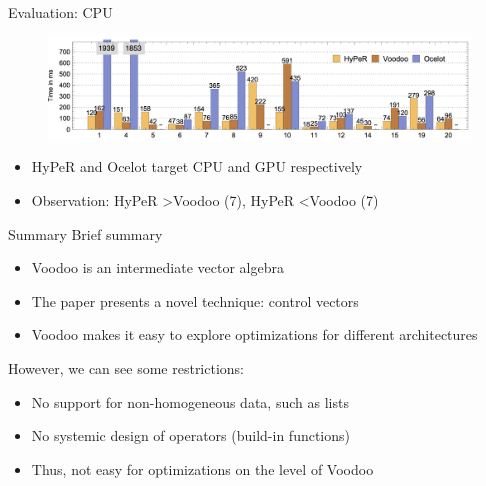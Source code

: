 \begin{frame}{Evaluation: CPU}
\begin{figure}[htb]
\includegraphics[width=1\textwidth]{fig/voodoo-fig13.png}
\end{figure}
\begin{itemize}
\item HyPeR and Ocelot target CPU and GPU respectively
\item Observation: HyPeR \textgreater Voodoo (7), HyPeR \textless Voodoo (7)
\end{itemize} 
\end{frame}

\begin{frame}{Summary}
Brief summary
\begin{itemize}
\item Voodoo is an intermediate vector algebra
\item The paper presents a novel technique: control vectors
\item Voodoo makes it easy to explore optimizations for different architectures
\end{itemize} 
\pause
However, we can see some restrictions:
\begin{itemize}
\item No support for non-homogeneous data, such as lists
\item No systemic design of operators (build-in functions)
\item Thus, not easy for optimizations on the level of Voodoo
\end{itemize} 
\end{frame}

